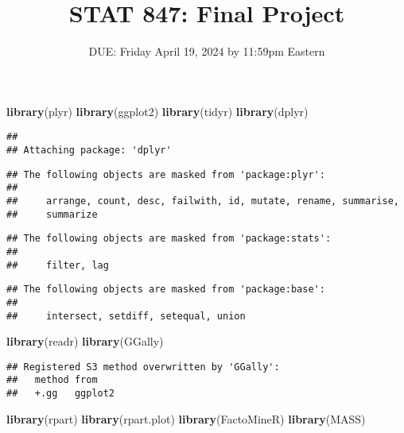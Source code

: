 \documentclass[
  a3paper,
]{article}
\title{STAT 847: Final Project}
\subtitle{DUE: Friday April 19, 2024 by 11:59pm Eastern}
\author{}
\date{\vspace{-2.5em}}
\newenvironment{Shaded}{\begin{snugshade}}{\end{snugshade}}
\newcommand{\FunctionTok}[1]{\textcolor[rgb]{0.13,0.29,0.53}{\textbf{#1}}}
\newcommand{\NormalTok}[1]{#1}
\begin{document}
\maketitle

\begin{Shaded}
\begin{Highlighting}[]
\FunctionTok{library}\NormalTok{(plyr)}
\FunctionTok{library}\NormalTok{(ggplot2)}
\FunctionTok{library}\NormalTok{(tidyr)}
\FunctionTok{library}\NormalTok{(dplyr)}
\end{Highlighting}
\end{Shaded}

\begin{verbatim}
## 
## Attaching package: 'dplyr'
\end{verbatim}

\begin{verbatim}
## The following objects are masked from 'package:plyr':
## 
##     arrange, count, desc, failwith, id, mutate, rename, summarise,
##     summarize
\end{verbatim}

\begin{verbatim}
## The following objects are masked from 'package:stats':
## 
##     filter, lag
\end{verbatim}

\begin{verbatim}
## The following objects are masked from 'package:base':
## 
##     intersect, setdiff, setequal, union
\end{verbatim}

\begin{Shaded}
\begin{Highlighting}[]
\FunctionTok{library}\NormalTok{(readr)}
\FunctionTok{library}\NormalTok{(GGally)}
\end{Highlighting}
\end{Shaded}

\begin{verbatim}
## Registered S3 method overwritten by 'GGally':
##   method from   
##   +.gg   ggplot2
\end{verbatim}

\begin{Shaded}
\begin{Highlighting}[]
\FunctionTok{library}\NormalTok{(rpart)}
\FunctionTok{library}\NormalTok{(rpart.plot)}
\FunctionTok{library}\NormalTok{(FactoMineR)}
\FunctionTok{library}\NormalTok{(MASS)}
\end{Highlighting}
\end{Shaded}
\end{document}
